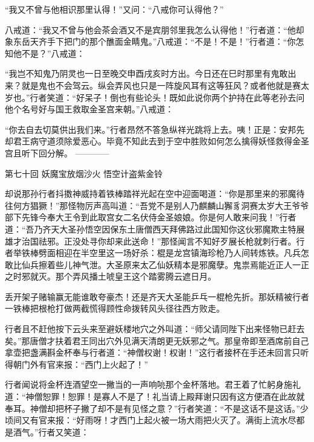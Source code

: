 \documentclass[12pt,UTF8]{ctexbook}
\begin{document}
“我又不曾与他相识那里认得！”又问：“八戒你可认得他？”

八戒道：“我又不曾与他会茶会酒又不是宾朋邻里我怎么认得他！”行者道：“他却象东岳天齐手下把门的那个醮面金睛鬼。”八戒道：“不是！不是！”行者道：“你怎知他不是？”八戒道：

“我岂不知鬼乃阴灵也一日至晚交申酉戌亥时方出。今日还在巳时那里有鬼敢出来？就是鬼也不会驾云。纵会弄风也只是一阵旋风耳有这等狂风？或者他就是赛太岁也。”行者笑道：“好呆子！倒也有些论头！既如此说你两个护持在此等老孙去问他个名号好与国王救取金圣宫来朝。”八戒道：

“你去自去切莫供出我们来。”行者昂然不答急纵祥光跳将上去。咦！正是：安邦先却君王病守道须除爱恶心。毕竟不知此去到于空中胜败如何怎么擒得妖怪救得金圣宫且听下回分解。
------------

第七十回 妖魔宝放烟沙火 悟空计盗紫金铃

却说那孙行者抖擞神威持着铁棒踏祥光起在空中迎面喝道：“你是那里来的邪魔待往何方猖獗！”那怪物厉声高叫道：“吾党不是别人乃麒麟山獬豸洞赛太岁大王爷爷部下先锋今奉大王令到此取宫女二名伏侍金圣娘娘。你是何人敢来问我！”行者道：“吾乃齐天大圣孙悟空因保东土唐僧西天拜佛路过此国知你这伙邪魔欺主特展雄才治国祛邪。正没处寻你却来此送命！”那怪闻言不知好歹展长枪就刺行者。行者举铁棒劈面相迎在半空里这一场好杀：棍是龙宫镇海珍枪乃人间转炼铁。凡兵怎敢比仙兵擦着些儿神气泄。大圣原来太乙仙妖精本是邪魔孽。鬼祟焉能近正人一正之时邪就灭。那个弄风播土唬皇王这个踏雾腾云遮日月。

丢开架子赌输赢无能谁敢夸豪杰！还是齐天大圣能乒乓一棍枪先折。那妖精被行者一铁棒把根枪打做两截慌得顾性命拨转风头径往西方败走。

行者且不赶他按下云头来至避妖楼地穴之外叫道：“师父请同陛下出来怪物已赶去矣。”那唐僧才扶着君王同出穴外见满天清朗更无妖邪之气。那皇帝即至酒席前自己拿壶把盏满斟金杯奉与行者道：“神僧权谢！权谢！”这行者接杯在手还未回言只听得朝门外有官来报：“西门上火起了！”

行者闻说将金杯连酒望空一撇当的一声响喨那个金杯落地。君王着了忙躬身施礼道：“神僧恕罪！恕罪！是寡人不是了！礼当请上殿拜谢只因有这方便酒在此故就奉耳。神僧却把杯子撇了却不是有见怪之意？”行者笑道：“不是这话不是这话。”少顷间又有官来报：“好雨呀！才西门上起火被一场大雨把火灭了。满街上流水尽都是酒气。”行者又笑道：
\end{document}
